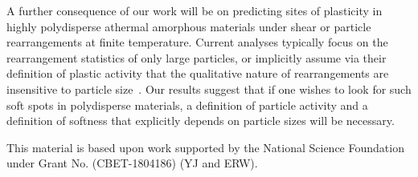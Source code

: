 \documentclass[%
 reprint,
 amsmath,amssymb,
 aps,
]{revtex4-2}
\begin{document}
A further consequence of our work will be on predicting sites of plasticity in highly polydisperse athermal amorphous materials under shear or particle rearrangements at finite temperature. Current analyses typically focus on the rearrangement statistics of only large particles, or implicitly assume via their definition of plastic activity that the qualitative nature of rearrangements are insensitive to particle size~\cite{manning11,cubuk15,schoenholz16,bapst2020unveiling,boattini2021averaging,ding2014soft,patinet2016connecting,obadiya2022does}. Our results suggest that if one wishes to look for such soft spots in polydisperse materials, a definition of particle activity and a definition of softness that explicitly depends on particle sizes will be necessary.



\begin{acknowledgments}
This material is based upon work supported by the National Science Foundation under Grant No. (CBET-1804186) (YJ and ERW).
\end{acknowledgments}



\end{document}
